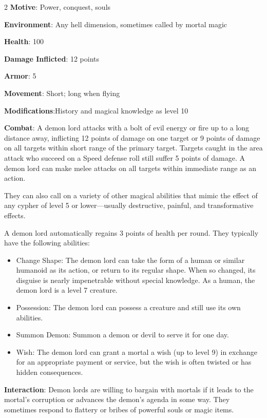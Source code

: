 \begin{multicols}{2}
\textbf{Motive}: Power, conquest, souls 

\textbf{Environment}: Any hell dimension, sometimes called by mortal magic 

\textbf{Health}: 100

\textbf{Damage Inflicted}: 12 points 

\textbf{Armor}: 5 

\textbf{Movement}: Short; long when flying 

\textbf{Modifications}:History and magical knowledge as level 10

\textbf{Combat}: A demon lord attacks with a bolt of evil energy or fire up to a long distance away, inflicting 12 points of damage on one target or 9 points of damage on all targets within short range of the primary target. Targets caught in the area attack who succeed on a Speed defense roll still suffer 5 points of damage. A demon lord can make melee attacks on all targets within immediate range as an action. 

They can also call on a variety of other magical abilities that mimic the effect of any cypher of level 5 or lower—usually destructive, painful, and transformative effects.

A demon lord automatically regains 3 points of health per round. They typically have the following abilities: 

\begin{itemize} 
\item Change Shape: The demon lord can take the form of a human or similar humanoid as its action, or return to its regular shape. When so changed, its disguise is nearly impenetrable without special knowledge. As a human, the demon lord is a level 7 creature. 
\item Possession: The demon lord can possess a creature and still use its own abilities. 
\item Summon Demon: Summon a demon or devil to serve it for one day. 
\item Wish: The demon lord can grant a mortal a wish (up to level 9) in exchange for an appropriate payment or service, but the wish is often twisted or has hidden consequences. 
\end{itemize}

\textbf{Interaction}: Demon lords are willing to bargain with mortals if it leads to the mortal’s corruption or advances the demon’s agenda in some way. They sometimes respond to flattery or bribes of powerful souls or magic items. 


\end{multicols}
